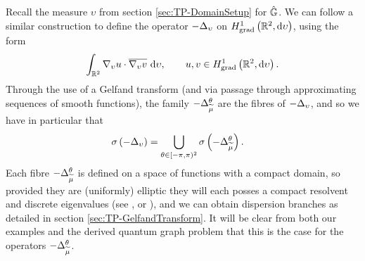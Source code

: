 Recall the measure $\upsilon$ from section \ref{sec:TP-DomainSetup} for $\hat{\mathbb{G}}$.
We can follow a similar construction to define the operator $-\Delta_{\upsilon}$ on $H^1_\mathrm{grad}\left( \mathbb{R}^2, \mathrm{d}\upsilon \right)$, using the form
\begin{align*}
	\int_{\mathbb{R}^2} \nabla_{\upsilon}u\cdot\overline{\nabla_{\upsilon}v}  \ \mathrm{d}\upsilon,
	\qquad u,v\in H^1_\mathrm{grad}\left( \mathbb{R}^2, \mathrm{d}\upsilon \right).
\end{align*}
Through the use of a Gelfand transform (and via passage through approximating sequences of smooth functions), the family $-\Delta_{\widetilde{\mu}}^{\theta}$ are the fibres of $-\Delta_{\upsilon}$, and so we have in particular that
\begin{align*}
	\sigma\left(  -\Delta_{\upsilon}  \right) &= \bigcup_{\theta\in[-\pi,\pi)^2} \sigma\left(  -\Delta_{\widetilde{\mu}}^{\theta}  \right).
\end{align*}
Each fibre $-\Delta_{\widetilde{\mu}}^{\theta}$ is defined on a space of functions with a compact domain, so provided they are (uniformly) elliptic they will each posses a compact resolvent and discrete eigenvalues (see \cite[section 7.3]{kuchment2001mathematics}, or \cite[section 4.5]{kuchment1993floquet}), and we can obtain dispersion branches as detailed in section \ref{sec:TP-GelfandTransform}.
It will be clear from both our examples and the derived quantum graph problem that this is the case for the operators $-\Delta_{\widetilde{\mu}}^{\theta}$.

